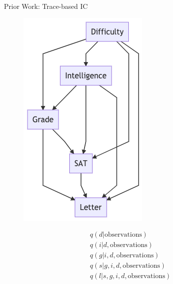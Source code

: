 \begin{frame}[fragile]{Prior Work: Trace-based IC \parencite{le2017inference}}
\begin{minipage}{0.4\linewidth}
    \begin{figure}
        \centering
        \includegraphics[width=\linewidth]{Figures/lic/student-network-smc-ic.png}
    \end{figure}
\end{minipage}
\begin{minipage}{0.5\linewidth}
    \begin{align*}
        & q(d | \text{observations}) \\
        & q(i|d, \text{observations}) \\
        & q(g | i, d, \text{observations}) \\
        & q(s | g, i, d, \text{observations}) \\
        & q(l | s, g, i, d, \text{observations})
    \end{align*}
\end{minipage}
\end{frame}

